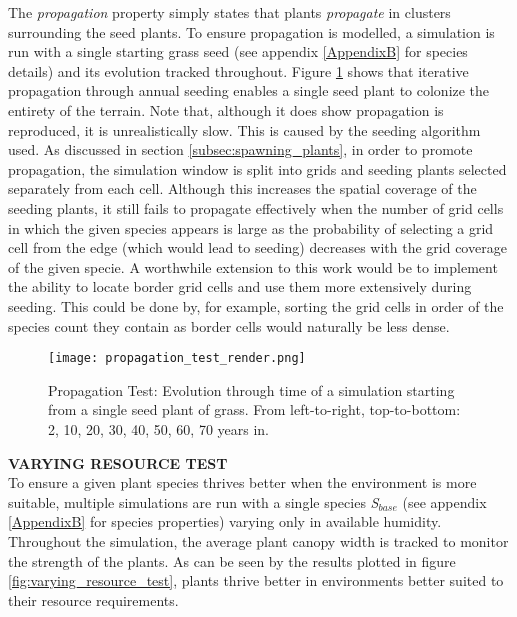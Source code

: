 The \textit{propagation} property simply states that plants \textit{propagate} in clusters surrounding the seed plants. To ensure propagation is modelled, a simulation is run with a single starting grass seed (see appendix \ref{AppendixB} for species details) and its evolution tracked throughout. Figure \ref{fig:propagation_test_render} shows that iterative propagation through annual seeding enables a single seed plant to colonize the entirety of the terrain. Note that, although it does show propagation is reproduced, it is unrealistically slow. This is caused by the seeding algorithm used. As discussed in section \ref{subsec:spawning_plants}, in order to promote propagation, the simulation window is split into grids and seeding plants selected separately from each cell. Although this increases the spatial coverage of the seeding plants, it still fails to propagate effectively when the number of grid cells in which the given species appears is large as the probability of selecting a grid cell from the edge (which would lead to seeding) decreases with the grid coverage of the given specie. A worthwhile extension to this work would be to implement the ability to locate border grid cells and use them more extensively during seeding. This could be done by, for example, sorting the grid cells in order of the species count they contain as border cells would naturally be less dense. \\

\begin{figure}
\center
	\texttt{[image: propagation\_test\_render.png]}
	\caption{ Propagation Test: Evolution through time of a simulation starting from a single seed plant of grass. From left-to-right, top-to-bottom: 2, 10, 20, 30, 40, 50, 60, 70 years in.}
	\label{fig:propagation_test_render}
\end{figure}

\textbf{VARYING RESOURCE TEST} \\

To ensure a given plant species thrives better when the environment is more suitable, multiple simulations are run with a single species \textit{S$_{base}$} (see appendix \ref{AppendixB} for species properties) varying only in available humidity. Throughout the simulation, the average plant canopy width is tracked to monitor the strength of the plants. As can be seen by the results plotted in figure \ref{fig:varying_resource_test}, plants thrive better in environments better suited to their resource requirements.\\

